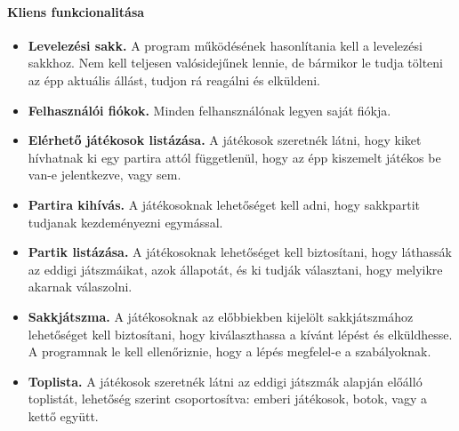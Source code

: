 \documentclass[twoside, a4paper, 12pt]{book}
\begin{document}
\paragraph{Kliens funkcionalitása}
\begin{itemize}
	\item \textbf{Levelezési sakk.} A program működésének hasonlítania kell a levelezési sakkhoz. Nem kell teljesen valósidejűnek lennie, de bármikor le tudja tölteni az épp aktuális állást, tudjon rá reagálni és elküldeni.
	
	\item \textbf{Felhasználói fiókok.} Minden felhansználónak legyen saját fiókja.
	
	\item \textbf{Elérhető játékosok listázása.} A játékosok szeretnék látni, hogy kiket hívhatnak ki egy partira attól függetlenül, hogy az épp kiszemelt játékos be van-e jelentkezve, vagy sem.
	
	\item \textbf{Partira kihívás.} A játékosoknak lehetőséget kell adni, hogy sakkpartit tudjanak kezdeményezni egymással.
	
	\item \textbf{Partik listázása.} A játékosoknak lehetőséget kell biztosítani, hogy láthassák az eddigi játszmáikat, azok állapotát, és ki tudják választani, hogy melyikre akarnak válaszolni.
	
	\item \textbf{Sakkjátszma.} A játékosoknak az előbbiekben kijelölt sakkjátszmához lehetőséget kell biztosítani, hogy kiválaszthassa a kívánt lépést és elküldhesse. A programnak le kell ellenőriznie, hogy a lépés megfelel-e a szabályoknak.
	
	\item \textbf{Toplista.} A játékosok szeretnék látni az eddigi játszmák alapján előálló toplistát, lehetőség szerint csoportosítva: emberi játékosok, botok, vagy a kettő együtt.
\end{itemize}

\end{document}
